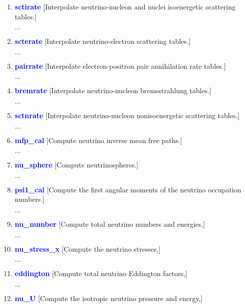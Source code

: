 \documentclass[11pt,doublespace]{article}
\begin{document}
\begin{itemize}
\begin{enumerate}
\begin{enumerate}
\begin{enumerate}
{\begin{enumerate}
  $\ldots$ \item \textcolor{blue}{ {\bf sctirate} }
  [Interpolate neutrino-nucleon and nuclei isoenergetic scattering tables.]

  $\ldots$ \item \textcolor{blue}{ {\bf scterate} }
  [Interpolate neutrino-electron scattering tables.]

  $\ldots$ \item \textcolor{blue}{ {\bf pairrate} }
  [Interpolate electron-positron pair annihilation rate tables.]

  $\ldots$ \item \textcolor{blue}{ {\bf bremrate} }
  [Interpolate neutrino-nucleon bremsstrahlung tables.]

  $\ldots$ \item \textcolor{blue}{ {\bf sctnrate} }
  [Interpolate neutrino-nucleon nonisoenergetic scattering tables.]

  $\ldots$ \item \textcolor{blue}{ {\bf mfp\_cal} }
  [Compute neutrino inverse mean free paths.]

  $\ldots$ \item \textcolor{blue}{ {\bf nu\_sphere} }
  [Compute neutrinospheres.]

  $\ldots$ \item \textcolor{blue}{ {\bf psi1\_cal} }
  [Compute the first angular moments of the neutrino occupation numbers.]

  $\ldots$ \item \textcolor{blue}{ {\bf nu\_number} }
  [Compute total neutrino numbers and energies,]

  $\ldots$ \item \textcolor{blue}{ {\bf nu\_stress\_x} }
  [Compute the neutrino stresses,]

  $\ldots$ \item \textcolor{blue}{ {\bf eddington} }
  [Compute total neutrino Eddington factors,]

  $\ldots$ \item \textcolor{blue}{ {\bf nu\_U} }
  [Compute the isotropic neutrino pressure and energy,]

\end{enumerate}

  }
    
  \color[rgb]{0,0.5,0.5}{

  \item The following is performed if nrst $>$ 0:

}
\end{enumerate}
\end{enumerate}
\end{enumerate}
\end{itemize}
\end{document}
